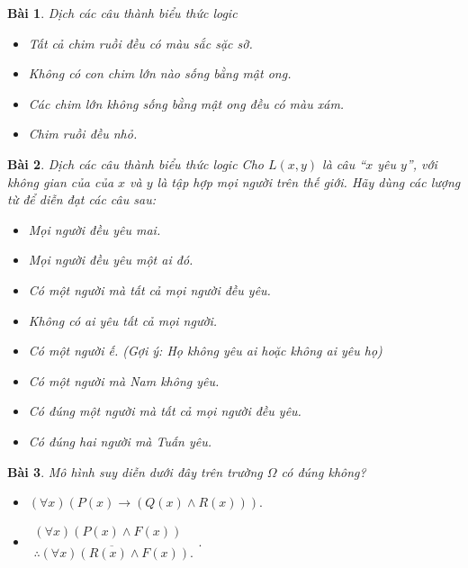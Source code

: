\documentclass[11pt, oneside,openright,a4paper]{book}
\newtheorem{bt}{Bài }[section]
\begin{document}
\begin{bt}
 Dịch các câu thành biểu thức logic
 \begin{itemize}
 \item[a)] Tất cả chim ruồi đều có màu sắc sặc sỡ.
 \item[b)] Không có con chim lớn nào sống bằng mật ong.
 \item[c)] Các chim lớn không sống bằng mật ong đều có màu xám.
 \item[d)] Chim ruồi đều nhỏ.
 \end{itemize}
\end{bt}
\begin{bt}
Dịch các câu thành biểu thức logic
Cho $L(x,y)$ là câu ``$x$ yêu $y$'', với không gian của của $x$ và $y$ là tập hợp mọi người trên thế giới. Hãy dùng các lượng từ để diễn đạt các câu sau:
    \begin{itemize}
     \item[a)] Mọi người đều yêu mai.
        \item[b)] Mọi người đều yêu một ai đó.
        \item[c)] Có một người mà tất cả mọi người đều yêu.
        \item[d)] Không có ai yêu tất cả mọi người.
        \item[e)] Có một người ế. (Gợi ý: Họ không yêu ai hoặc không ai yêu họ)
        \item[f)] Có một người mà Nam không yêu.
        \item[g)] Có đúng một người mà tất cả mọi người đều yêu.
        \item[h)] Có đúng hai người mà Tuấn yêu.
    \end{itemize}
\end{bt}
\begin{bt}
Mô hình suy diễn dưới đây trên trường $\Omega$ có đúng không?
\begin{itemize}
\item[a)]$(\forall x) (P(x) \rightarrow (Q(x) \land R(x))).$
\item[b)] $\begin{matrix}
       (\forall x) (P(x) \land F(x))\\
    \overline{\therefore (\forall x)(R(x) \land F(x))}.
\end{matrix}.$
\end{itemize}

\end{bt}
\end{document}
